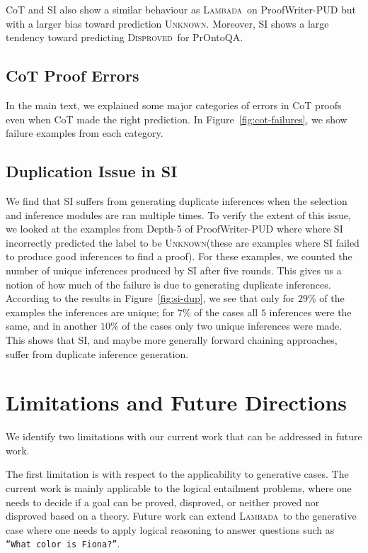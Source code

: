 \documentclass[11pt]{article}
\newcommand{\algo}{\textsc{Lambada}}
\newcommand{\disproved}{\textsc{Disproved}}
\newcommand{\unk}{\textsc{Unknown}}
\begin{document}
CoT and SI also show a similar behaviour as \algo\ on ProofWriter-PUD but with a larger bias toward prediction \unk. Moreover, SI shows a large tendency toward predicting \disproved\ for PrOntoQA.

\subsection{CoT Proof Errors} \label{sec:cot-proof-errors}
In the main text, we explained some major categories of errors in CoT proofs even when CoT made the right prediction. In Figure~\ref{fig:cot-failures}, we show failure examples from each category.

\subsection{Duplication Issue in SI}
We find that SI suffers from generating duplicate inferences when the selection and inference modules are ran multiple times. To verify the extent of this issue, we looked at the examples from Depth-5 of ProofWriter-PUD where where SI incorrectly predicted the label to be \unk (these are examples where SI failed to produce good inferences to find a proof). For these examples, we counted the number of unique inferences produced by SI after five rounds. This gives us a notion of how much of the failure is due to generating duplicate inferences. According to the results in Figure~\ref{fig:si-dup}, we see that only for $29\%$ of the examples the inferences are unique; for $7\%$ of the cases all $5$ inferences were the same, and in another $10\%$ of the cases only two unique inferences were made. This shows that SI, and maybe more generally forward chaining approaches, suffer from duplicate inference generation.

\section{Limitations and Future Directions}
We identify two limitations with our current work that can be addressed in future work.

The first limitation is with respect to the applicability to generative cases. The current work is mainly applicable to the logical entailment problems, where one needs to decide if a goal can be proved, disproved, or neither proved nor disproved based on a theory. Future work can extend \algo\ to the generative case where one needs to apply logical reasoning to answer questions such as \texttt{``What color is Fiona?''}.
\end{document}
